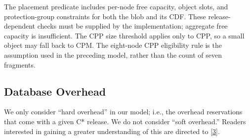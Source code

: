 The placement predicate includes per-node free capacity, object slots,
and protection-group constraints for both the blob and its CDF. These
release-dependent checks must be supplied by the implementation; aggregate
free capacity is insufficient. The CPP size threshold applies only to CPP,
so a small object may fall back to CPM. The eight-node CPP eligibility rule
is the assumption used in the preceding model, rather than the count of
seven fragments.


\subsection{Database Overhead}\label{database-overhead-3}

We only consider ``hard overhead'' in our model; i.e., the overhead reservations that come with a given C* release. We do not consider ``soft overhead.'' Readers interested in gaining a greater understanding of this are directed to \hyperref[ref:3]{[3]}.
